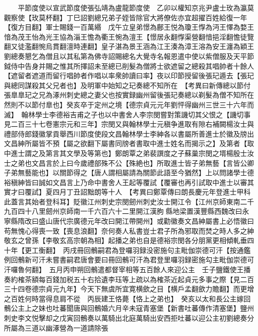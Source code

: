 　　平節度使以宣武節度使張弘靖為盧龍節度使　乙卯以權知京兆尹盧士玫為瀛莫觀察使【玫莫杯翻】丁巳詔劉總兄弟子姪皆除官大將僚佐亦宜超擢百姓給復一年【復方目翻】軍士賜錢一百萬緡　戊午立皇弟憬為鄜王悦為瓊王惸為沔王懌為婺王愔為茂王怡為光王協為淄王憺為衢王惋為澶王【憬居永翻惸渠營翻愔挹淫翻憺徒覽翻又徒濫翻惋烏貫翻澶時連翻】皇子湛為景王涵為江王湊為漳王溶為安王瀍為穎王　劉總奏懇乞為僧且以其私第為佛寺詔賜總名大覺寺名報恩遣中使以紫僧服及天平節鉞侍中告身并賜之惟其所擇詔未至總已削髮為僧將士欲遮留之總殺其唱帥者十餘人【遮留者遮道而留行唱帥者作唱以率衆帥讀曰率】夜以印節授留後張玘遁去【張玘與總同謀殺其父兄者也】及明軍中始知之玘奏總不知所在　【考異曰新傳總以節付張臯臯玘之兄為涿州刺史總之妻父也按實録幽州留後張玘奏總以剃髮為僧不知所在然則不以節付臯也】癸亥卒于定州之境【德宗貞元元年劉怦得幽州三世三十六年而滅】　翰林學士李德裕吉甫之子也以中書舍人李宗閔嘗對策譏切其父恨之【譏切事見二百三十七卷憲宗元和三年】宗閔又與翰林學士元稹争進取有隙右補闕楊汝士與禮部侍郎錢徽掌貢舉西川節度使段文昌翰林學士李紳各以書屬所善進士於徽及牓出文昌紳所屬皆不預【屬之欲翻下屬書同牓者書取中進士姓名而揭示之】及第者【取中進士謂之及第言其文學及等第也】鄭朗覃之弟裴譔度之子蘇巢宗閔之壻楊殷士汝士之弟也文昌言於上曰今歲禮部殊不公【殊絶也】所取進士皆子弟無藝【言皆公卿子弟無藝能也】以關節得之【唐人謂相屬請為關節此語至今猶然】上以問諸學士德裕稹紳皆曰誠如文昌言上乃命中書舍人王起等覆試【覆審也再引試取中進士以審其實才曰覆試】夏四月丁丑詔黜朗等十人　【考異曰鄭覃傳曰朗長慶元年登進士甲科此蓋言其始者登科耳】貶徽江州刺史宗閔劒州刺史汝士開江令【江州京師東南二千九百四十八里劒州京師南一千六百六十二里開江漢朐縣地梁置漢豐縣西魏改曰永寧縣隋改曰盛山唐代宗廣德元年改曰開江帶開州】或勸徽奏文昌紳屬書上必悟徽曰苟無愧心得喪一致【喪息浪翻】奈何奏人私書豈士君子所為邪取而焚之時人多之紳敬玄之曾孫【李敬玄高宗朝為相】起播之弟也自是德裕宗閔各分朋黨更相傾軋垂四十年【更工衡翻】　丙戌冊回鶻嗣君為登囉羽録没密施句主毗伽崇德可汗【按通鑑例回鶻新可汗未嘗書嗣君唐會要曰冊回鶻可汗為君登里囉羽録密施勾主毗伽崇德可汗囉魯何翻】　五月丙申朔回鶻遣都督宰相等五百餘人來迎公主　壬子鹽鐵使王播奏約榷茶額每百錢加税五十右拾遺李珏等上疏以為榷茶近起貞元多事之際【見二百三十四卷德宗貞元九年】今天下無虞所宜寛横歛之目【横戶孟翻歛力贍翻】而更增之百姓何時當得息肩不從　丙辰建王恪薨【恪上之弟也】　癸亥以太和長公主嫁回鶻公主上之妹也吐蕃聞唐與回鶻婚六月辛未寇青塞堡【新書吐蕃傳作清塞堡】鹽州刺史李文悦擊却之戊寅回鶻奏以萬騎出北庭萬騎出安西拒吐蕃以迎公主初劉總奏分所屬為三道以幽涿營為一道請除張


